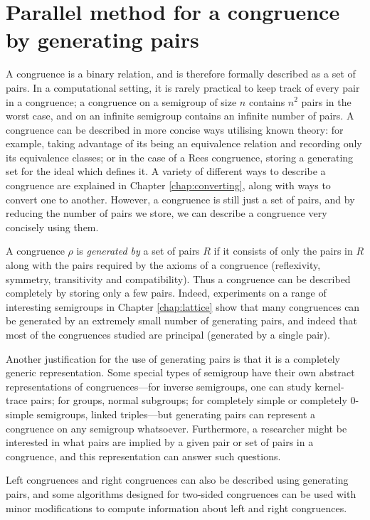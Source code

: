 \chapter{Parallel method for a congruence by generating pairs}
\label{chap:pairs}

A congruence is a binary relation, and is therefore formally described as a set
of pairs.  In a computational setting, it is rarely practical to keep track of
every pair in a congruence; a congruence on a semigroup of size $n$ contains
$n^2$ pairs in the worst case, and on an infinite semigroup contains an infinite
number of pairs.  A congruence can be described in more concise ways utilising
known theory: for example, taking advantage of its being an equivalence relation
and recording only its equivalence classes; or in the case of a Rees congruence,
storing a generating set for the ideal which defines it.  A variety of different
ways to describe a congruence are explained in Chapter \ref{chap:converting},
along with ways to convert one to another.  However, a congruence is still just
a set of pairs, and by reducing the number of pairs we store, we can describe a
congruence very concisely using them.

A congruence $\rho$ is \textit{generated by} a set of pairs $R$ if it consists
of only the pairs in $R$ along with the pairs required by the axioms of a
congruence (reflexivity, symmetry, transitivity and compatibility).  Thus a
congruence can be described completely by storing only a few pairs.
Indeed, experiments on a range of interesting semigroups in Chapter
\ref{chap:lattice} show that many congruences can be generated by an extremely
small number of generating pairs, and indeed that most of the congruences
studied are principal (generated by a single pair). %

Another justification for the use of generating pairs is that it is a completely
generic representation.  Some special types of semigroup have their own abstract
representations of congruences---for inverse semigroups, one can study
kernel-trace pairs; for groups, normal subgroups; for completely simple or
completely 0-simple semigroups, linked triples---but generating pairs can
represent a congruence on any semigroup whatsoever.  Furthermore, a researcher
might be interested in what pairs are implied by a given pair or set of pairs in
a congruence, and this representation can answer such questions.

Left congruences and right congruences can also be described using generating
pairs, and some algorithms designed for two-sided congruences can be used with
minor modifications to compute information about left and right congruences.

